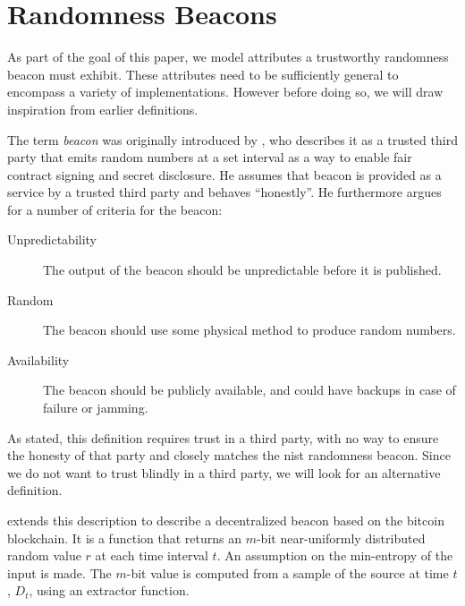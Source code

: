 \section{Randomness Beacons}\label{sec:beacons}

As part of the goal of this paper, we model attributes a trustworthy randomness beacon must exhibit.
These attributes need to be sufficiently general to encompass a variety of implementations.
However before doing so, we will draw inspiration from earlier definitions.


The term \emph{beacon} was originally introduced by \citet{rabin1983transaction}, who describes it as a trusted third party that emits random numbers at a set interval as a way to enable fair contract signing and secret disclosure.
He assumes that beacon is provided as a service by a trusted third party and behaves \enquote{honestly}.
He furthermore argues for a number of criteria for the beacon:

\begin{description}
    \item[Unpredictability] The output of the beacon should be unpredictable before it is published. 
    \item[Random] The beacon should use some physical method to produce random numbers.
    \item[Availability] The beacon should be publicly available, and could have backups in case of failure or jamming.
\end{description}

As stated, this definition requires trust in a third party, with no way to ensure the honesty of that party and closely matches the \gls{nist} randomness beacon.
Since we do not want to trust blindly in a third party, we will look for an alternative definition.

\citet{bonneau2015bitcoin} extends this description to describe a decentralized beacon based on the bitcoin blockchain.
It is a function that returns an $m$-bit near-uniformly distributed random value $r$ at each time interval $t$.
An assumption on the min-entropy of the input is made.
The $m$-bit value is computed from a sample of the source at time $t$, $D_t$, using an extractor function. 

